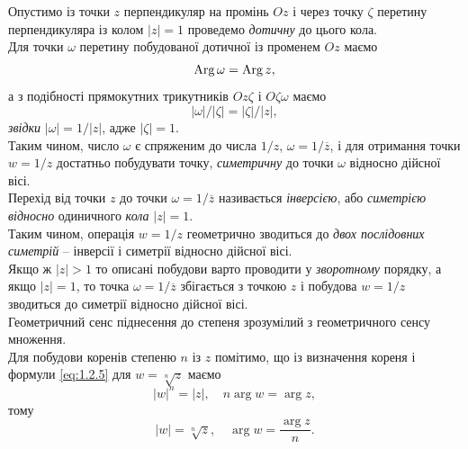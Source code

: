 Опустимо із точки $z$ перпендикуляр на промінь $Oz$ і через точку $\zeta$ перетину перпендикуляра із колом $|z| = 1$ проведемо \textit{дотичну} до цього кола. \\

Для точки $\omega$ перетину побудованої дотичної із променем $Oz$ маємо 
\begin{equation}
	\label{eq:1.2.6}
	\operatorname{Arg} \omega = \operatorname{Arg} z,
\end{equation}
а з подібності прямокутних трикутників $Oz\zeta$ і $O\zeta \omega$ маємо 
\begin{equation}
	\label{eq:1.2.7}
	|\omega| / |\zeta| = |\zeta| / |z|,
\end{equation}
\textit{звідки} $|\omega| = 1 / |z|$, адже $|\zeta| = 1$. \\

Таким чином, число $\omega$ є спряженим до числа $1 / z$, $\omega = 1 / \overline{z}$, і для отримання точки $w = 1 / z$ достатньо побудувати точку, \textit{симетричну} до точки $\omega$ відносно дійсної вісі. \\

Перехід від точки $z$ до точки $\omega = 1 / \overline{z}$ називається \textit{інверсією}, або \textit{симетрією відносно} одиничного \textit{кола} $|z| = 1$. \\

Таким чином, операція $w = 1 / z$ геометрично зводиться до \textit{двох послідовних симетрій} -- інверсії і симетрії відносно дійсної вісі. \\

Якщо ж $|z| > 1$ то описані побудови варто проводити у \textit{зворотному} порядку, а якщо $|z| = 1$, то точка $\omega = 1 / \overline{z}$ збігається з точкою $z$ і побудова $w = 1 / z$ зводиться до симетрії відносно дійсної вісі. \\

Геометричний сенс піднесення до степеня зрозумілий з геометричного сенсу множення. \\

Для побудови коренів степеню $n$ із $z$ помітимо, що із визначення кореня і формули \eqref{eq:1.2.5} для $w = \sqrt[n]{z}$ маємо 
\begin{equation}
	\label{eq:1.2.8}
	|w|^n = |z|, \quad n \arg w = \arg z,
\end{equation}
тому
\begin{equation}
	\label{eq:1.2.9}
	|w| = \sqrt[n]{z}, \quad \arg w = \dfrac{\arg z}{n}.
\end{equation}

